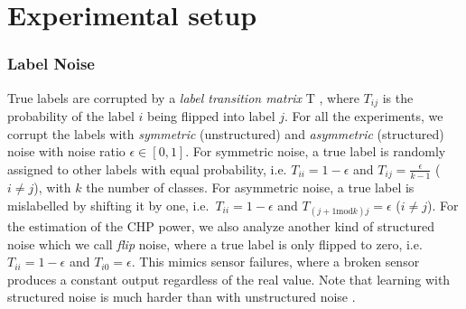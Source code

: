 \documentclass[runningheads, envcountsame, a4paper]{llncs}
\newcommand{\m}[1]{\ensuremath{\mathrm{#1}}}
\begin{document}


\section{Experimental setup}

\subsubsection{Label Noise}\label{sec:noise}
True labels are corrupted by a \textit{label transition matrix} T \cite{song2020learning}, where $T_{ij}$ %
is the probability of the label $i$ being flipped into label $j$. 
For all the experiments, we corrupt the labels with \textit{symmetric} (unstructured) and \textit{asymmetric} (structured) noise with noise ratio $\epsilon \in [0, 1]$.
For symmetric noise, a true label is randomly assigned to other labels with equal probability, i.e.  $T_{ii} = 1 - \epsilon$ and $ T_{ij}= \frac{\epsilon}{k-1}$ ($i\neq j$), with $k$ the number of classes.
For asymmetric noise,  a true label is mislabelled by shifting it by one, i.e.\ $T_{ii} = 1 - \epsilon$ and $T_{(j+1\m{mod} k )j} = \epsilon$ ($i\neq j$).
For the estimation of the CHP power, we also analyze another kind of structured noise which we call \textit{flip} noise, where a true label is only flipped to zero, i.e.\  $ T_{ii} = 1 - \epsilon$ and $T_{i0} = \epsilon$. 
This mimics %
sensor failures, where a broken sensor produces a constant output regardless of the real value.
Note that learning with structured noise is much harder than with unstructured noise \cite{frenay2013classification}.
\end{document}
